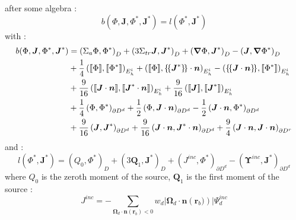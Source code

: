 after some algebra :
\begin{equation}
b\left(\Phi,\boldsymbol{J},\Phi^*,\boldsymbol{J}^*\right) = l\left(\Phi^*,\boldsymbol{J}^*\right)
\label{P1SA}
\end{equation}
with :
\begin{equation}
\begin{split}
b(\Phi,\boldsymbol{J},\Phi^*,\boldsymbol{J}^*) &= \left(\Sigma_a \Phi,\Phi^*\right)_D + \left(3\Sigma_{tr} \boldsymbol{J},\boldsymbol{J}^*\right)_D+\left(\boldsymbol{\nabla} \Phi,\boldsymbol{J}^*\right)_D - \left(\boldsymbol{J},\boldsymbol{\nabla} \Phi^*\right)_D\\
&+ \frac{1}{4} \left(\llbracket\Phi\rrbracket,\llbracket\Phi^*\rrbracket\right)_{E_h^i}+\left(\llbracket\Phi\rrbracket,\{\!\{\boldsymbol{J}^*\}\!\}\cdot\boldsymbol{n}\right)_{E_h^i} -
\left(\{\!\{\boldsymbol{J}\cdot\boldsymbol{n}\}\!\},\llbracket\Phi^*\rrbracket\right)_{E_h^i}\\
& + \frac{9}{16}\left(\llbracket \boldsymbol{J}\cdot\boldsymbol{n}\rrbracket,\llbracket \boldsymbol{J}^*\cdot\boldsymbol{n}\rrbracket\right)_{E_h^i} + \frac{9}{16}\left(\llbracket\boldsymbol{J}\rrbracket, \llbracket \boldsymbol{J}^*\rrbracket\right)_{E_h^i}\\
&+\frac{1}{4}\left(\Phi,\Phi^*\right)_{\partial D^d} + \frac{1}{2} \left(\Phi,\boldsymbol{J}\cdot \boldsymbol{n}\right)_{\partial D^d} - \frac{1}{2}\left(\boldsymbol{J}\cdot\boldsymbol{n},\Phi^*\right)_{\partial D^d}\\
&+\frac{9}{16}\left(\boldsymbol{J},\boldsymbol{J}^*\right)_{\partial D^d} + \frac{9}{16}\left(\boldsymbol{J}\cdot\boldsymbol{n},\boldsymbol{J}^*\cdot\boldsymbol{n}\right)_{\partial D^d}+\frac{9}{4} \left(\boldsymbol{J}\cdot\boldsymbol{n}, \boldsymbol{J}\cdot\boldsymbol{n}\right)_{\partial D^r}
\end{split}
\end{equation}
and :
\begin{equation}
l(\Phi^*,\boldsymbol{J}^*) = \left(Q_0,\Phi^*\right)_D + \left(3\boldsymbol{Q}_1,\boldsymbol{J}^*\right)_D + \left(J^{inc},\Phi^*\right)_{\partial D^d} - \left(\boldsymbol{\Upsilon}^{inc},\boldsymbol{J}^*\right)_{\partial D^d}
\end{equation}
where $Q_0$ is the zeroth moment of the source, $\boldsymbol{Q}_1$ is the first moment of the source :
\begin{equation}
J^{inc} = -\sum_{\boldsymbol{\Omega}_d \cdot \boldsymbol{n}(\boldsymbol{r}_b)<0} w_d |\boldsymbol{\Omega}_d \cdot \boldsymbol{n}\left(\boldsymbol{r}_b)\right)| \Psi_d^{inc}
\end{equation}
